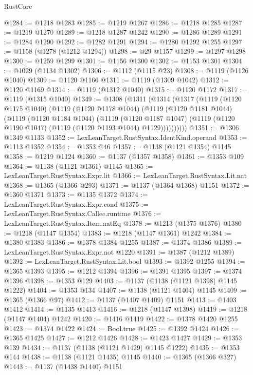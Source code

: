 \begin{lexlean}{RustCore}
\begin{coremodule}
@1284 := @1218 @1283
@1285 := @1219 @1267
@1286 := @1218 @1285
@1287 := @1219 @1270
@1289 := @1218 @1287 @1242
@1290 := @1286 @1289
@1291 := @1284 @1290
@1292 := @1282 @1291
@1294 := @1280 @1292 @1255
@1297 := @1158 (@1278 (@1212 @1294))
@1298 := @29 @1157
@1299 := @1297 @1298
@1300 := @1259 @1299
@1301 := @1156 @1300
@1302 := @1153 @1301
@1304 := @1029 (@1134 @1302)
@1306 := @1112 (@1115 @23)
@1308 := @1119 (@1126 @1040)
@1309 := @1120 @1166
@1311 := @1119 (@1309 @1042)
@1312 := @1120 @1169
@1314 := @1119 (@1312 @1040)
@1315 := @1120 @1172
@1317 := @1119 (@1315 @1040)
@1349 := @1308
    (@1311
      (@1314
        (@1317
          (@1119
            (@1120 @1175 @1040)
            (@1119
              (@1120 @1178 @1044)
              (@1119
                (@1120 @1181 @1044)
                (@1119
                  (@1120 @1184 @1044)
                  (@1119
                    (@1120 @1187 @1047)
                    (@1119 (@1120 @1190 @1047) (@1119 (@1120 @1193 @1044) @1129))))))))))
@1351 := @1306 @1349 @1133
@1352 := LexLeanTarget.RustSyntax.IdentKind.operand
@1353 := @1113 @1352
@1354 := @1353 @46
@1357 := @1138 (@1121 @1354) @1145
@1358 := @1219 @1124
@1360 := @1137 (@1357 @1358)
@1361 := @1353 @109
@1364 := @1138 (@1121 @1361) @1145
@1365 := LexLeanTarget.RustSyntax.Expr.lit
@1366 := LexLeanTarget.RustSyntax.Lit.nat
@1368 := @1365 (@1366 @293)
@1371 := @1137 (@1364 @1368) @1151
@1372 := @1360 @1371
@1373 := @1135 @1372
@1374 := LexLeanTarget.RustSyntax.Expr.cond
@1375 := LexLeanTarget.RustSyntax.Callee.runtime
@1376 := LexLeanTarget.RustSyntax.Item.natEq
@1378 := @1213 (@1375 @1376)
@1380 := @1218 (@1147 @1354)
@1383 := @1218 (@1147 @1361) @1242
@1384 := @1380 @1383
@1386 := @1378 @1384 @1255
@1387 := @1374 @1386
@1389 := LexLeanTarget.RustSyntax.Expr.not @1220
@1391 := @1387 (@1212 @1389)
@1392 := LexLeanTarget.RustSyntax.Lit.bool
@1393 := @1392 @1255
@1394 := @1365 @1393
@1395 := @1212 @1394
@1396 := @1391 @1395
@1397 := @1374 @1396
@1398 := @1353 @129
@1403 := @1137 (@1138 (@1121 @1398) @1145 @1222)
@1404 := @1353 @134
@1407 := @1138 (@1121 @1404) @1145
@1409 := @1365 (@1366 @97)
@1412 := @1137 (@1407 @1409) @1151
@1413 := @1403 @1412
@1414 := @1135 @1413
@1416 := @1218 (@1147 @1398)
@1419 := @1218 (@1147 @1404) @1242
@1420 := @1416 @1419
@1422 := @1378 @1420 @1255
@1423 := @1374 @1422
@1424 := Bool.true
@1425 := @1392 @1424
@1426 := @1365 @1425
@1427 := @1212 @1426
@1428 := @1423 @1427
@1429 := @1353 @139
@1434 := @1137 (@1138 (@1121 @1429) @1145 @1222)
@1435 := @1353 @144
@1438 := @1138 (@1121 @1435) @1145
@1440 := @1365 (@1366 @327)
@1443 := @1137 (@1438 @1440) @1151

\end{coremodule}
\end{lexlean}
